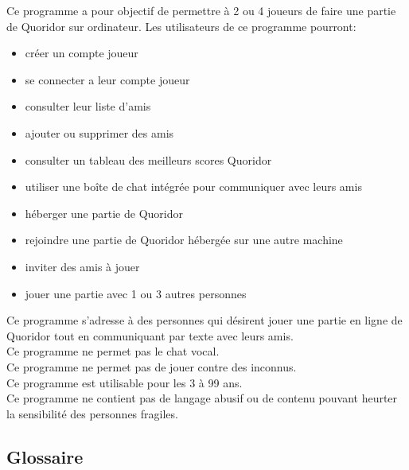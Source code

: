 \documentclass[a4paper,10pt]{article}
\begin{document}
Ce programme a pour objectif de permettre à 2 ou 4 joueurs de faire une partie de Quoridor sur ordinateur. Les utilisateurs de ce programme pourront:

\begin{itemize}
    \item créer un compte joueur
    \item se connecter a leur compte joueur
    \item consulter leur liste d'amis
    \item ajouter ou supprimer des amis
    \item consulter un tableau des meilleurs scores Quoridor
    \item utiliser une boîte de chat intégrée pour communiquer avec leurs amis
    \item héberger une partie de Quoridor
    \item rejoindre une partie de Quoridor hébergée sur une autre machine
    \item inviter des amis à jouer
    \item jouer une partie avec 1 ou 3 autres personnes
\end{itemize}
\noindent
Ce programme s'adresse à des personnes qui désirent jouer une partie en ligne de Quoridor tout en communiquant par texte avec leurs amis.\\
Ce programme ne permet pas le chat vocal.\\
Ce programme ne permet pas de jouer contre des inconnus.\\
Ce programme est utilisable pour les 3 à 99 ans.\\
Ce programme ne contient pas de langage abusif ou de contenu pouvant heurter la sensibilité des personnes fragiles.


\subsection{Glossaire}
\label{glo}
\end{document}
